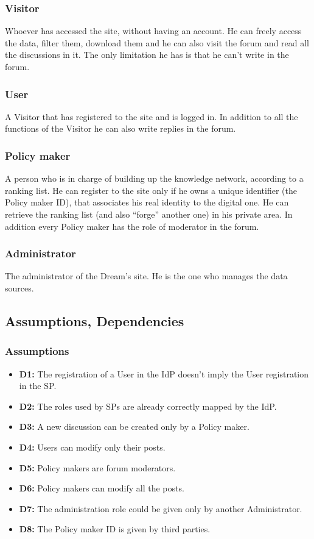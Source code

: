 \subsubsection{Visitor}
Whoever has accessed the site, without having an account. He can freely access the data, filter them, download them and he can also visit the forum and read all the discussions in it. The only limitation he has is that he can’t write in the forum.

\subsubsection{User}
A Visitor that has registered to the site and is logged in. In addition to all the functions of the Visitor he can also write replies in the forum.

\subsubsection{Policy maker}
A person who is in charge of building up the knowledge network, according to a ranking list. He can register to the site only if he owns a unique identifier (the Policy maker ID), that associates his real identity to the digital one. He can retrieve the ranking list (and also “forge” another one) in his private area.
In addition every Policy maker has the role of moderator in the forum.

\subsubsection{Administrator}
The administrator of the Dream’s site. He is the one who manages the data sources.

\subsection{Assumptions, Dependencies}
\subsubsection{Assumptions}
\begin{itemize}
    \item \textbf{D1:} The registration of a User in the IdP doesn’t imply the User registration in the SP.
    \item \textbf{D2:} The roles used by SPs are already correctly mapped by the IdP. 
    \item \textbf{D3:} A new discussion can be created only by a Policy maker.
    \item \textbf{D4:} Users can modify only their posts.
    \item \textbf{D5:} Policy makers are forum moderators.
    \item \textbf{D6:} Policy makers can modify all the posts.
    \item \textbf{D7:} The administration role could be given only by another Administrator.
    \item \textbf{D8:} The Policy maker ID is given by third parties.
\end{itemize} 

